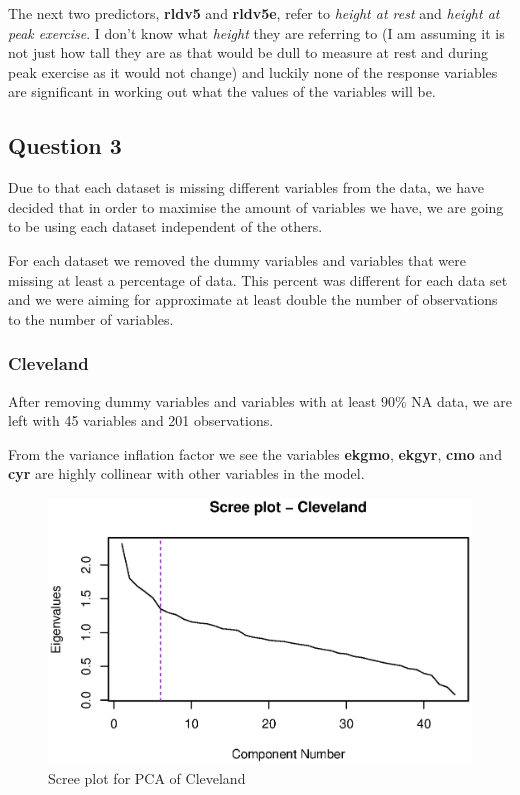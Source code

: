 \documentclass[a4paper]{article}
\begin{document}
\newpage
The next two predictors, \textbf{rldv5} and \textbf{rldv5e}, refer to
\textit{height at rest} and \textit{height at peak exercise}. I don't know what
\textit{height} they are referring to (I am assuming it is not just how tall
they are as that would be dull to measure at rest and during peak exercise as it
would not change) and luckily none of the response variables are significant in
working out what the values of the variables will be.



\newpage
\subsection{Question 3}

Due to that each dataset is missing different variables from the data, we have decided that in order to maximise the amount of variables we have, we are going to be using each dataset independent of the others. 

For each dataset we removed the dummy variables and variables that were missing at least a percentage of data. This percent was different for each data set and we were aiming for approximate at least double the number of observations to the number of variables. 

\subsubsection{Cleveland}

After removing dummy variables and variables with at least $90\%$ NA data, we are left with 45 variables and 201 observations. 



From the variance inflation factor we see the variables \textbf{ekgmo}, \textbf{ekgyr}, \textbf{cmo} and \textbf{cyr} are highly collinear with other variables in the model.

\begin{figure}[H]
	\begin{center}
		\includegraphics[width=12cm]{question3output/clescreeplot.eps}
	\end{center}
	\caption{Scree plot for PCA of Cleveland}
	\label{q3-cle-screeplot}
\end{figure}
\end{document}
